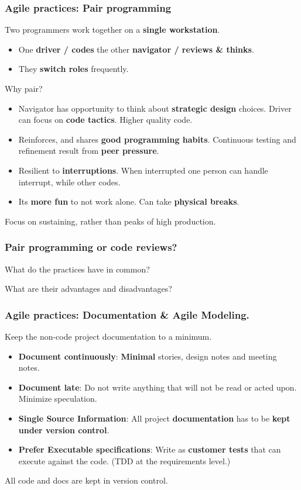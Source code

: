\documentclass{beamer} %
\newcommand\emc[1]{\textcolor{midred}{\textbf{#1}}}
\begin{document}
\begin{frame}

\frametitle{Agile practices: Pair programming}

Two programmers work together on a \emc{single workstation}. 
\begin{itemize}
\item One \emc{driver / codes} the other \emc{navigator / reviews \& thinks}.
\item They \emc{switch roles} frequently.
\end{itemize}

Why pair?
\begin{itemize}
  \item Navigator has opportunity to think about \emc{strategic design} choices. Driver can focus on  \emc{code tactics}. Higher quality code.
  \item Reinforces, and shares \emc{good programming habits}. Continuous testing and refinement result from \emc{peer pressure}.
  \item Resilient to \emc{interruptions}. When interrupted one person can handle interrupt, while other codes.
  \item Its \emc{more fun} to not work alone. Can take \emc{physical breaks}.
\end{itemize}
Focus on sustaining, rather than peaks of high production.

\end{frame}


\begin{frame}
\frametitle{Pair programming or code reviews?}

What do the practices have in common?

\vspace{5mm}
What are their advantages and disadvantages?

\end{frame}



\begin{frame}

\frametitle{Agile practices: Documentation \& Agile Modeling.}

Keep the non-code project documentation to a minimum.
\begin{itemize}
\item \emc{Document continuously}: \emc{Minimal} stories, design notes and meeting notes.
\item \emc{Document late}: Do not write anything that will not be read or acted upon. Minimize speculation.
\item \emc{Single Source Information}: All project \emc{documentation} has to be \emc{kept under version control}.
\item \emc{Prefer Executable specifications}: Write as \emc{customer tests} that can execute against the code. (TDD at the requirements level.)
\end{itemize}

\vspace{5mm}
All code and docs are kept in version control.
\end{frame}
\end{document}
